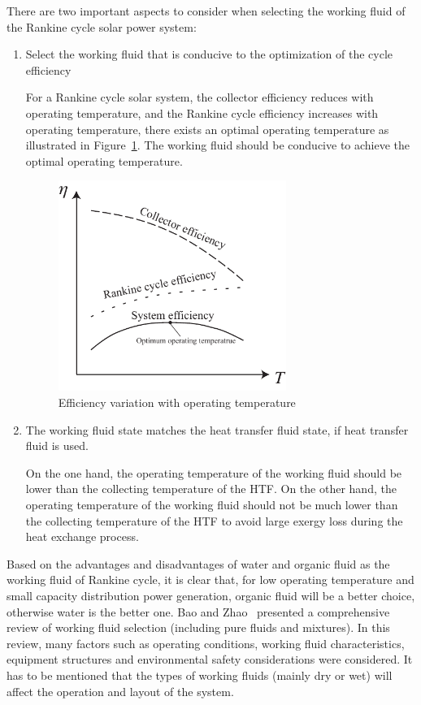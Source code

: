There are two important aspects to consider when selecting the working fluid of the Rankine cycle solar power system:
\begin{enumerate}
  \item Select the working fluid that is conducive to the optimization of the cycle efficiency
  
  For a Rankine cycle solar system, the collector efficiency reduces with operating temperature, and the Rankine cycle efficiency increases with operating temperature, there exists an optimal operating temperature as illustrated in Figure~\ref{fig:Efficiency}. The working fluid should be conducive to achieve the optimal operating temperature.
  
  \begin{figure}[!ht]
\centering 
\includegraphics[width=0.7\textwidth]{fig/Efficiency}
\caption{Efficiency variation with operating temperature}\label{fig:Efficiency}
\end{figure}
  
  \item The working fluid state matches the heat transfer fluid state, if heat transfer fluid is used.
  
  On the one hand, the operating temperature of the working fluid should be lower than the collecting temperature of the HTF. On the other hand, the operating temperature of the working fluid should not be much lower than the collecting temperature of the HTF to avoid large exergy loss during the heat exchange process.
  
\end{enumerate}

Based on the advantages and disadvantages of water and organic fluid as the working fluid of Rankine cycle, it is clear that, for low operating temperature and small capacity distribution power generation, organic fluid will be a better choice, otherwise water is the better one. Bao and Zhao~\cite{Bao2013} presented a comprehensive review of working fluid selection (including pure fluids and mixtures). In this review, many factors such as operating conditions, working fluid characteristics, equipment structures and environmental safety considerations were considered.
It has to be mentioned that the types of working fluids (mainly dry or wet) will affect the operation and layout of the system.

